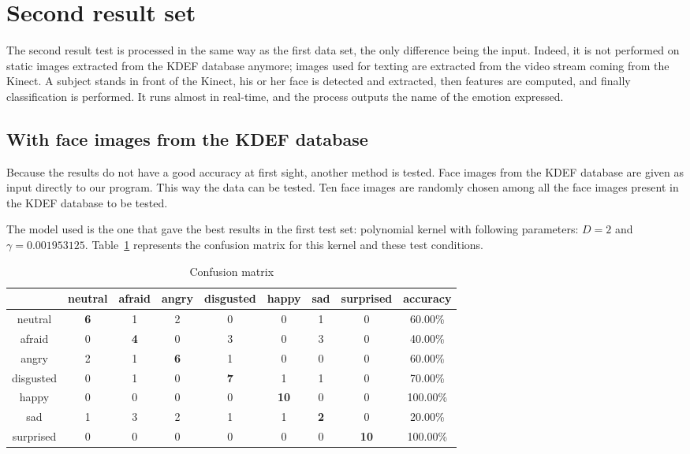 \section{Second result set}

\vspace{\baselineskip}
\noindent The second result test is processed in the same way as the first data set, the only difference being the input. Indeed, it is not performed on static images extracted from the KDEF database anymore; images used for texting are extracted from the video stream coming from the Kinect. A subject stands in front of the Kinect, his or her face is detected and extracted, then features are computed, and finally classification is performed. It runs almost in real-time, and the process outputs the name of the emotion expressed.
\newline

\subsection{With face images from the KDEF database}

\vspace{\baselineskip}
\noindent Because the results do not have a good accuracy at first sight, another method is tested. Face images from the KDEF database are given as input directly to our program. This way the data can be tested. Ten face images are randomly chosen among all the face images present in the KDEF database to be tested. 
\newline

\noindent The model used is the one that gave the best results in the first test set: polynomial kernel with following parameters: $ D = 2 $ and $ \gamma = 0.001953125 $. Table~\ref{table_results_confusion_matrix_offline} represents the confusion matrix for this kernel and these test conditions.
\newline

\begin{table}[h]
\begin{center}
   \caption{\label{table_results_confusion_matrix_offline} Confusion matrix}
\begin{tabular}{|c|c|c|c|c|c|c|c|c|}
  \hline
   & neutral & afraid & angry & disgusted & happy & sad & surprised & accuracy \\
  \hline
  neutral & \textbf{6} & 1 & 2 & 0 & 0 & 1 & 0 & 60.00\% \\
  afraid & 0 & \textbf{4} & 0 & 3 & 0 & 3 & 0 & 40.00\% \\
  angry & 2 & 1 & \textbf{6} & 1 & 0 & 0 & 0 & 60.00\% \\
  disgusted & 0 & 1 & 0 & \textbf{7} & 1 & 1 & 0 & 70.00\% \\
  happy & 0 & 0 & 0 & 0 & \textbf{10} & 0 & 0 & 100.00\% \\
  sad & 1 & 3 & 2 & 1 & 1 & \textbf{2} & 0 & 20.00\% \\
  surprised & 0 & 0 & 0 & 0 & 0 & 0 & \textbf{10} & 100.00\%\\
  \hline
\end{tabular}
\end{center}
\end{table}

